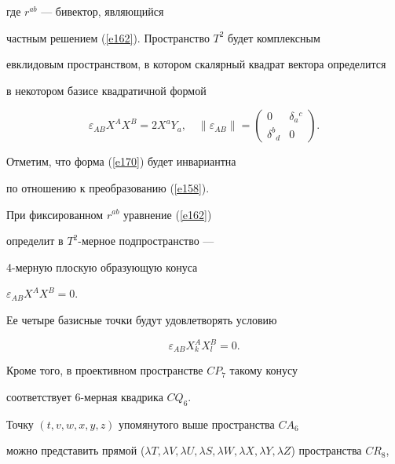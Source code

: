 где $r^{ab}$ --- бивектор, являющийся


частным решением (\ref{e162}). Пространство $T^2$ будет комплексным


евклидовым пространством, в котором скалярный квадрат вектора определится


в некотором базисе квадратичной формой


\begin{equation}


\label{e170} %


\varepsilon_{AB}X^AX^B=2X^aY_a,\quad


\| \varepsilon_{AB}\|=


\begin{pmatrix}


0 & \delta_a{}^c \\


\delta^b{}_d & 0


\end{pmatrix}


.


\end{equation}


Отметим, что форма (\ref{e170}) будет инвариантна


по отношению к преобразованию (\ref{e158}).


При фиксированном $r^{ab}$ уравнение (\ref{e162})


определит в $T^2$-мерное подпространство ---


4-мерную плоскую образующую конуса


$\varepsilon_{AB}X^AX^B=0$.


Ее четыре базисные точки будут удовлетворять условию


\begin{equation} %


\label{e174}


\varepsilon_{AB}X^A_kX^B_l=0.


\end{equation}


Кроме того, в проективном пространстве $CP_7$ такому конусу


соответствует 6-мерная квадрика $CQ_6$.


Точку $(t,v,w,x,y,z)$ упомянутого выше пространства $CA_6$


можно представить прямой ($\lambda T,\lambda V,\lambda U,\lambda S,


\lambda W,\lambda X,\lambda Y,\lambda Z$) пространства $CR_8$,


